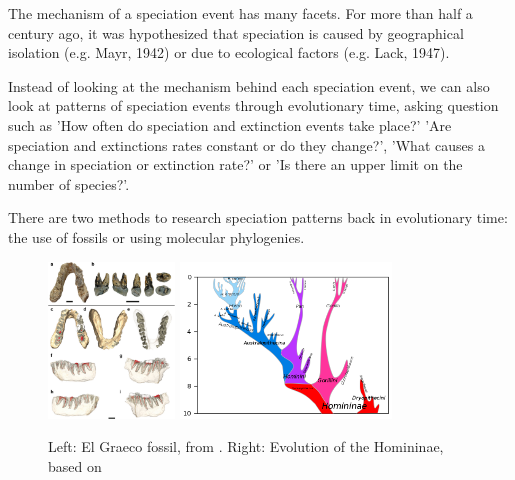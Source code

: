 The mechanism of a speciation event has many facets.
For more than half a century ago, it was hypothesized
that speciation is caused by geographical isolation (e.g. Mayr, 1942)
or due to ecological factors (e.g. Lack, 1947).

Instead of looking at the mechanism behind each speciation event,
we can also look at patterns of speciation events through evolutionary time,
asking question such as 'How often do speciation and extinction events take place?'
'Are speciation and extinctions rates constant or do they change?',
'What causes a change in speciation or extinction rate?' or
'Is there an upper limit on the number of species?'.

There are two methods to research speciation patterns back in evolutionary time:
the use of fossils or using molecular phylogenies.

\begin{figure}[H]
  \includegraphics[width=0.3\textwidth]{Graecopithecus.jpg}
  \includegraphics[width=0.5\textwidth]{Hominini_lineage.png}
  \caption{
    Left: El Graeco fossil, from \cite{fuss2017potential}.
    Right: Evolution of the Homininae, based on \cite{stringer2012makes}
 }
  \label{fig:human_evolution}
\end{figure}

